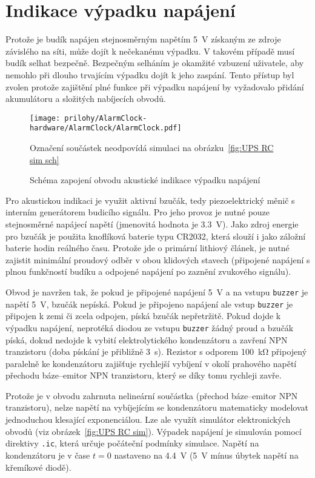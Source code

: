 \section{Indikace výpadku napájení}
Protože je budík napájen stejnosměrným napětím \SI{5}{\volt} získaným ze zdroje
závislého na síti, může dojít k nečekanému výpadku. V takovém případě musí
budík selhat bezpečně. Bezpečným selháním je okamžité vzbuzení uživatele, aby
nemohlo při dlouho trvajícím výpadku dojít k jeho zaspání. Tento přístup byl
zvolen protože zajištění plné funkce při výpadku napájení by vyžadovalo přidání
akumulátoru a složitých nabíjecích obvodů.

\begin{figure}
    \centering
    \texttt{[image: prilohy/AlarmClock-hardware/AlarmClock/AlarmClock.pdf]}
    \par\bigskip
    {\footnotesize Označení součástek neodpovídá simulaci na
    obrázku~\vref{fig:UPS RC sim sch}}
    \caption{Schéma zapojení obvodu akustické indikace výpadku napájení}
    \label{fig:UPS sch}
\end{figure}

Pro akustickou indikaci je využit aktivní bzučák, tedy piezoelektrický měnič
s interním generátorem budicího signálu. Pro jeho provoz je nutné pouze
stejnosměrné napájecí napětí (jmenovitá hodnota je \SI{3,3}{\volt}).
Jako zdroj energie pro bzučák je použita knoflíková baterie typu CR2032, která
slouží i jako záložní baterie hodin reálného času. Protože jde o primární
lithiový článek, je nutné zajistit minimální proudový odběr v obou klidových
stavech (připojené napájení s plnou funkčností budíku a odpojené napájení po
zaznění zvukového signálu).

Obvod je navržen tak, že pokud je připojené napájení \SI{5}{\volt} a na vstupu
\texttt{buzzer} je napětí \SI{5}{\volt}, bzučák nepíská. Pokud je připojeno
napájení ale vstup \texttt{buzzer} je připojen k zemi či zcela odpojen, píská
bzučák nepřetržitě. Pokud dojde k výpadku napájení, neprotéká diodou ze vstupu
\texttt{buzzer} žádný proud a bzučák píská, dokud nedojde k vybití
elektrolytického kondenzátoru a zavření NPN tranzistoru (doba pískání je
přibližně \SI{3}{\second}). Rezistor s odporem \SI{100}{\kilo\ohm} připojený
paralelně ke kondenzátoru zajišťuje rychlejší vybíjení v okolí prahového napětí
přechodu báze--emitor NPN tranzistoru, který se díky tomu rychleji zavře.

Protože je v obvodu zahrnuta nelineární součástka (přechod báze--emitor NPN
tranzistoru), nelze napětí na vybíjejícím se kondenzátoru matematicky modelovat
jednoduchou klesající exponenciálou. Lze ale využít simulátor elektronických
obvodů (viz obrázek~\vref{fig:UPS RC sim}). Výpadek napájení je simulován
pomocí direktivy \verb|.ic|, která určuje počáteční podmínky simulace. Napětí
na kondenzátoru je v čase $t=0$ nastaveno na \SI{4,4}{\volt} (\SI{5}{\volt}
mínus úbytek napětí na křemíkové diodě).

